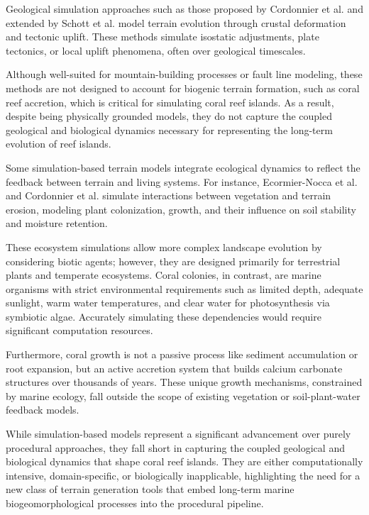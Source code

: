 
Geological simulation approaches such as those proposed by Cordonnier et al. \cite{Cordonnier2016, Cordonnier2017a} and extended by Schott et al. \cite{Schott2023} model terrain evolution through crustal deformation and tectonic uplift. These methods simulate isostatic adjustments, plate tectonics, or local uplift phenomena, often over geological timescales.

Although well-suited for mountain-building processes or fault line modeling, these methods are not designed to account for biogenic terrain formation, such as coral reef accretion, which is critical for simulating coral reef islands. As a result, despite being physically grounded models, they do not capture the coupled geological and biological dynamics necessary for representing the long-term evolution of reef islands.


Some simulation-based terrain models integrate ecological dynamics to reflect the feedback between terrain and living systems. For instance, Ecormier-Nocca et al. \cite{Ecormier-Nocca2021} and Cordonnier et al. \cite{Cordonnier2017b} simulate interactions between vegetation and terrain erosion, modeling plant colonization, growth, and their influence on soil stability and moisture retention.

These ecosystem simulations allow more complex landscape evolution by considering biotic agents; however, they are designed primarily for terrestrial plants and temperate ecosystems. Coral colonies, in contrast, are marine organisms with strict environmental requirements such as limited depth, adequate sunlight, warm water temperatures, and clear water for photosynthesis via symbiotic algae. Accurately simulating these dependencies would require significant computation resources.

Furthermore, coral growth is not a passive process like sediment accumulation or root expansion, but an active accretion system that builds calcium carbonate structures over thousands of years. These unique growth mechanisms, constrained by marine ecology, fall outside the scope of existing vegetation or soil-plant-water feedback models.

\midConclusion

While simulation-based models represent a significant advancement over purely procedural approaches, they fall short in capturing the coupled geological and biological dynamics that shape coral reef islands. They are either computationally intensive, domain-specific, or biologically inapplicable, highlighting the need for a new class of terrain generation tools that embed long-term marine biogeomorphological processes into the procedural pipeline.





